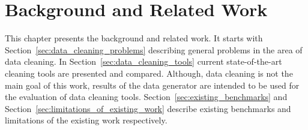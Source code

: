 
\chapter{Background and Related Work} 
\label{sec:background}

This chapter presents the background and related work.
It starts with Section~\ref{sec:data_cleaning_problems} describing general problems in the area of data cleaning.
In Section~\ref{sec:data_cleaning_tools} current state-of-the-art cleaning tools are presented and compared.
Although, data cleaning is not the main goal of this work, 
results of the data generator are intended to be used for the evaluation of data cleaning tools.
Section~\ref{sec:existing_benchmarks} and Section~\ref{sec:limitations_of_existing_work} describe existing benchmarks and limitations of the existing work respectively.





